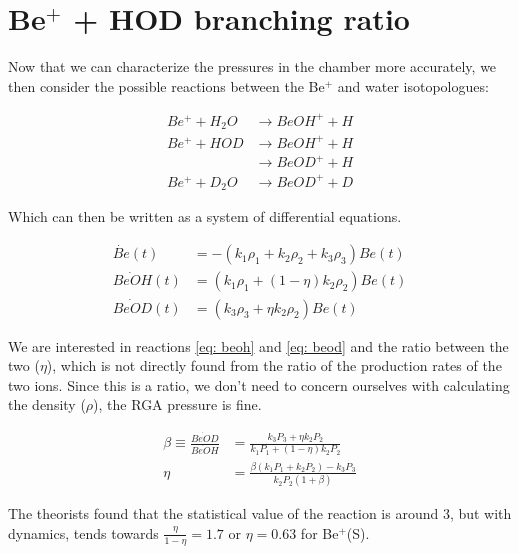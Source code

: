 \section{Be$^+$ + HOD branching ratio}

Now that we can characterize the pressures in the chamber more accurately, we then consider the possible reactions between the Be$^+$ and water isotopologues:

\begin{align}
Be^+ + H_2O & \rightarrow BeOH^+ + H \\
Be^+ + HOD & \rightarrow BeOH^+ + H \label{eq: beoh} \\
 & \rightarrow BeOD^+ + H \label{eq: beod} \\
Be^+ + D_2O & \rightarrow BeOD^+ + D
\end{align}

Which can then be written as a system of differential equations.

\begin{align}
\dot{Be}(t) & = -(k_1\rho_1+k_2\rho_2+k_3\rho_3)Be(t) \\
\dot{BeOH}(t) & = (k_1\rho_1+(1-\eta)k_2\rho_2)Be(t) \\
\dot{BeOD}(t) & = (k_3\rho_3+\eta k_2\rho_2)Be(t)
\end{align}

We are interested in reactions \ref{eq: beoh} and \ref{eq: beod} and the ratio between the two ($\eta$), which is not directly found from the ratio of the production rates of the two ions. Since this is a ratio, we don't need to concern ourselves with calculating the density ($\rho$), the RGA pressure is fine.

\begin{align}
\beta \equiv \frac{\dot{BeOD}}{\dot{BeOH}} & = \frac{k_3P_3 + \eta k_2P_2}{k_1P_1 + (1-\eta)k_2P_2} \\
\eta & = \frac{\beta(k_1P_1 + k_2P_2)-k_3P_3}{k_2P_2(1+\beta)}
\end{align}

The theorists found that the statistical value of the reaction is around 3, but with dynamics, tends towards $\frac{\eta}{1-\eta} = 1.7$ or $\eta=0.63$ for Be$^+$(S).